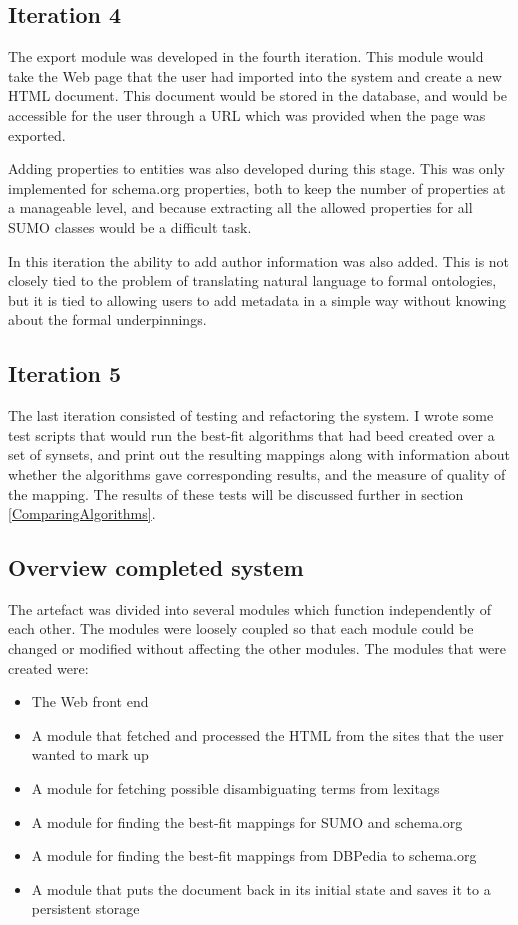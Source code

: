 \subsection{Iteration 4}
The export module was developed in the fourth iteration.
This module would take the Web page that the user had imported into the system and create a new HTML document.
This document would be stored in the database, and would be accessible for the user through a URL which was provided when the page was exported.

Adding properties to entities was also developed during this stage.
This was only implemented for schema.org properties,
both to keep the number of properties at a manageable level,
and because extracting all the allowed properties for all SUMO classes would be a difficult task.

In this iteration the ability to add author information was also added.
This is not closely tied to the problem of translating natural language to formal ontologies,
but it is tied to allowing users to add metadata in a simple way without knowing about the formal underpinnings.

\subsection{Iteration 5}
The last iteration consisted of testing and refactoring the system.
I wrote some test scripts that would run the best-fit algorithms that had beed created over a set of synsets,
and print out the resulting mappings along with information about whether the algorithms gave corresponding results,
and the measure of quality of the mapping.
The results of these tests will be discussed further in section \ref{ComparingAlgorithms}.

\subsection{Overview completed system}
The artefact was divided into several modules which function independently of each other.
The modules were loosely coupled so that each module could be changed or modified without affecting the other modules.
The modules that were created were:
\begin{itemize}
	\item The Web front end
	\item A module that fetched and processed the HTML from the sites that the user wanted to mark up
	\item A module for fetching possible disambiguating terms from lexitags
	\item A module for finding the best-fit mappings for SUMO and schema.org
	\item A module for finding the best-fit mappings from DBPedia to schema.org
	\item A module that puts the document back in its initial state and saves it to a persistent storage
\end{itemize}

